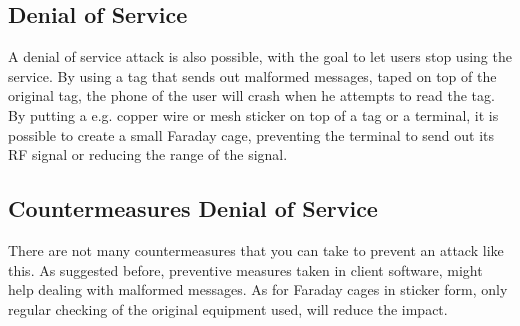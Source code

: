 
\subsection{Denial of Service}
A denial of service attack is also possible, with the goal to let users stop using the service. By using a tag that sends out malformed messages, taped on top of the original tag, the phone of the user will crash when he attempts to read the tag.
By putting a e.g. copper wire or mesh sticker on top of a tag or a terminal, it is possible to create a small Faraday cage, preventing the terminal to send out its RF signal or reducing the range of the signal. \cite{rieback2006your}

\subsection{Countermeasures Denial of Service}
There are not many countermeasures that you can take to prevent an attack like this. As suggested before, preventive measures taken in client software, might help dealing with malformed messages. 
As for Faraday cages in sticker form, only regular checking of the original equipment used, will reduce the impact.

